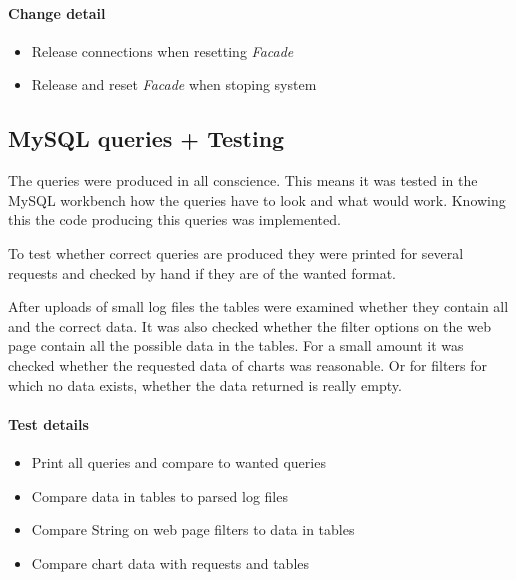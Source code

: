 \paragraph{Change detail} 
\begin{itemize}
  \item Release connections when resetting \textit{Facade}
   \item Release and reset \textit{Facade} when stoping system
\end{itemize}


\subsection{MySQL queries + Testing}
The queries were produced in all conscience. This means it was tested in the 
MySQL workbench how the queries have to look and what would work. Knowing this
the code producing this queries was implemented.

To test whether correct queries are produced they were printed for several requests
and checked by hand if they are of the wanted format.

After uploads of small log files the tables were examined whether they contain all
and the correct data. It was also checked whether the filter options on the web page
contain all the possible data in the tables. For a small amount it was checked
whether the requested data of charts was reasonable. Or for filters for which no 
data exists, whether the data returned is really empty.


\paragraph{Test details}
\begin{itemize}
  \item Print all queries and compare to wanted queries
  \item Compare data in tables to parsed log files
  \item Compare String on web page filters to data in tables 
  \item Compare chart data with requests and tables
\end{itemize}




